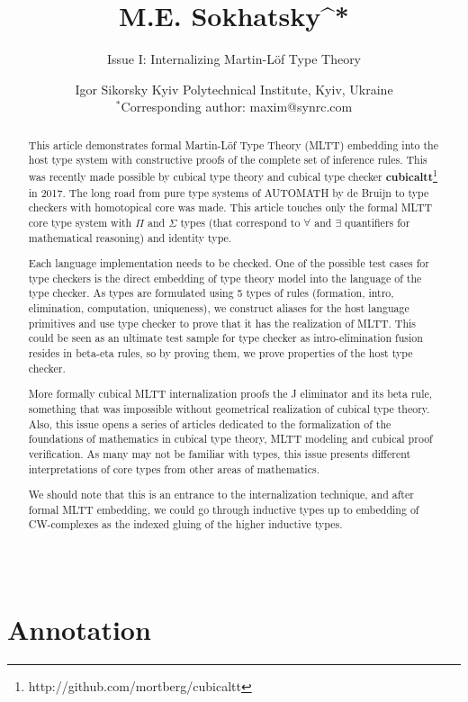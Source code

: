 \documentclass{article}
\theoremstyle{definition}
\begin{document}
\title{\small M.E. Sokhatsky^{*}}
\author{Issue I: Internalizing Martin-Löf Type Theory}
\date{ \small Igor Sikorsky Kyiv Polytechnical Institute, Kyiv, Ukraine\\
       \small $^*$Corresponding author: maxim@synrc.com}

\maketitle

\section*{Annotation}

\begin{abstract}

\justifying

This article demonstrates formal Martin-Löf Type Theory (MLTT)
embedding into the host type system with constructive proofs
of the complete set of inference rules. This was recently made
possible by cubical type theory and cubical type
checker {\bf cubicaltt}\footnote{http://github.com/mortberg/cubicaltt} in 2017.
The long road from pure type systems of AUTOMATH by de Bruijn to type
checkers with homotopical core was made. This article touches only
the formal MLTT core type system with $\Pi$ and $\Sigma$ types (that correspond
to $\forall$ and $\exists$ quantifiers for mathematical reasoning) and identity type.

Each language implementation needs to be checked. One of the possible
test cases for type checkers is the direct embedding of type theory
model into the language of the type checker. As types are formulated
using 5 types of rules (formation, intro, elimination,
computation, uniqueness), we construct aliases for the host
language primitives and use type checker to prove that it has
the realization of MLTT. This could be seen as an ultimate test
sample for type checker as intro-elimination fusion resides in
beta-eta rules, so by proving them, we prove properties of the
host type checker.

More formally cubical MLTT internalization proofs the J eliminator
and its beta rule, something that was impossible without geometrical
realization of cubical type theory. Also, this issue opens a series
of articles dedicated to the formalization of the foundations
of mathematics in cubical type theory, MLTT modeling and cubical
proof verification. As many may not be familiar with  types,
this issue presents different interpretations of core types from
other areas of mathematics.

We should note that this is an entrance to the internalization
technique, and after formal MLTT embedding, we could go through
inductive types up to embedding of CW-complexes as the indexed
gluing of the higher inductive types.
\\
\\
\\
\end{abstract}
\end{document}
